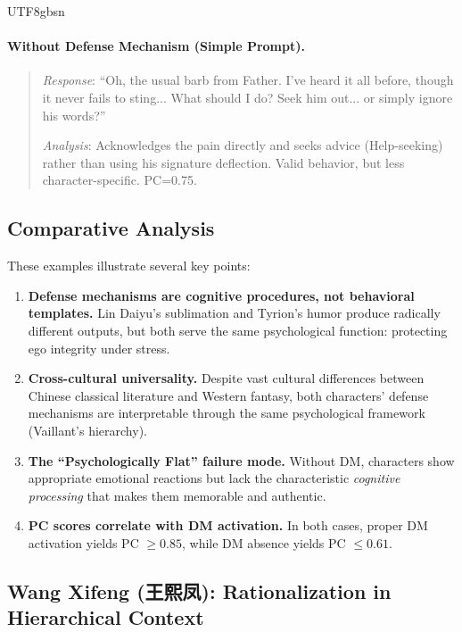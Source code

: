 \documentclass[11pt]{article}
\begin{document}
\begin{CJK*}{UTF8}{gbsn}
\paragraph{Without Defense Mechanism (Simple Prompt).}
\begin{quote}
\textit{Response}: ``Oh, the usual barb from Father. I've heard it all before, though it never fails to sting... What should I do? Seek him out... or simply ignore his words?''

\textit{Analysis}: Acknowledges the pain directly and seeks advice (Help-seeking) rather than using his signature deflection. Valid behavior, but less character-specific. PC=0.75.
\end{quote}

\subsection{Comparative Analysis}

These examples illustrate several key points:

\begin{enumerate}
    \item \textbf{Defense mechanisms are cognitive procedures, not behavioral templates.} Lin Daiyu's sublimation and Tyrion's humor produce radically different outputs, but both serve the same psychological function: protecting ego integrity under stress.
    
    \item \textbf{Cross-cultural universality.} Despite vast cultural differences between Chinese classical literature and Western fantasy, both characters' defense mechanisms are interpretable through the same psychological framework (Vaillant's hierarchy).
    
    \item \textbf{The ``Psychologically Flat'' failure mode.} Without DM, characters show appropriate emotional reactions but lack the characteristic \textit{cognitive processing} that makes them memorable and authentic.
    
    \item \textbf{PC scores correlate with DM activation.} In both cases, proper DM activation yields PC $\geq 0.85$, while DM absence yields PC $\leq 0.61$.
\end{enumerate}

\subsection{Wang Xifeng (王熙凤): Rationalization in Hierarchical Context}


\end{CJK*}
\end{document}
